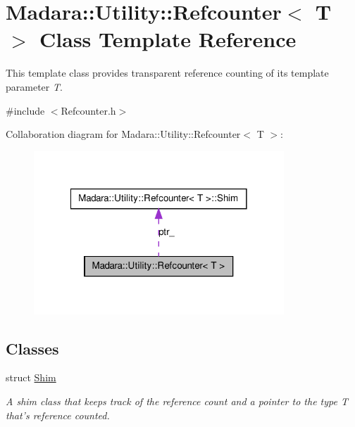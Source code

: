 \hypertarget{classMadara_1_1Utility_1_1Refcounter}{
\section{Madara::Utility::Refcounter$<$ T $>$ Class Template Reference}
\label{d5/dfa/classMadara_1_1Utility_1_1Refcounter}
}


This template class provides transparent reference counting of its template parameter {\itshape T\/}.  




{\ttfamily \#include $<$Refcounter.h$>$}



Collaboration diagram for Madara::Utility::Refcounter$<$ T $>$:
\nopagebreak
\begin{figure}[H]
\begin{center}
\leavevmode
\includegraphics[width=266pt]{d5/deb/classMadara_1_1Utility_1_1Refcounter__coll__graph}
\end{center}
\end{figure}
\subsection*{Classes}
\begin{DoxyCompactItemize}
\item 
struct \hyperlink{structMadara_1_1Utility_1_1Refcounter_1_1Shim}{Shim}
\begin{DoxyCompactList}\small\item\em A shim class that keeps track of the reference count and a pointer to the type {\itshape T\/} that's reference counted. \item\end{DoxyCompactList}\end{DoxyCompactItemize}
